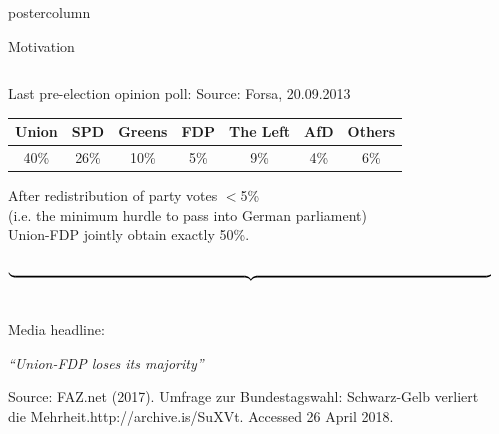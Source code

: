 \documentclass[final,hyperref={pdfpagelabels=false}]{beamer}
\newcommand{\blue}[1]{\textcolor{koaladarkestblue}{#1}}
\newcommand{\darkgray}[1]{\textcolor{koaladarkgray}{#1}}
\newcommand{\lightgray}[1]{\textcolor{koalagray}{#1}}
\begin{document}
\begin{frame}
\begin{columns}
\begin{column}{1\textwidth}
\begin{beamercolorbox}[center,wd=\textwidth]{postercolumn}
\begin{minipage}[T]{.95\textwidth}
\begin{block}{\footnotesize Motivation}
{{\begin{minipage}{0.94\textwidth}
\begin{columns}[t]
  \begin{column}{.29\textwidth}
  \darkgray{Last pre-election opinion poll:} \lightgray{\tiny Source: Forsa, 20.09.2013}
  \\[2.5ex]
  \begin{center}
  \begin{tabular}{ccccccc}
  \toprule
  \darkgray{Union} & {\footnotesize \lightgray{SPD}} & {\footnotesize \lightgray{Greens}} & \darkgray{FDP} & {\footnotesize \lightgray{The Left}} & {\footnotesize \lightgray{AfD}} & {\footnotesize \lightgray{Others}} \\ \midrule
  \darkgray{40\%} & {\footnotesize \lightgray{26\%}} & {\footnotesize \lightgray{10\%}} & \darkgray{5\%} & {\footnotesize \lightgray{9\%}} & {\footnotesize \lightgray{4\%}} & {\footnotesize \lightgray{6\%}} \\
  \bottomrule
  \end{tabular}
  \end{center}
  \vspace{1.5ex}
  \begin{center}
  \darkgray{After redistribution} \lightgray{\footnotesize of party votes $<$5\% \\ (i.e. the minimum hurdle to pass into German parliament)} \\
  \darkgray{Union-FDP} \lightgray{\footnotesize jointly} \darkgray{obtain} \lightgray{\footnotesize exactly} \darkgray{50\%}.
  \end{center}
  \vspace{-3ex}
  \textcolor{koalablue}{$$ \underbrace{\resizebox{\hsize}{!}{ }}_{ } $$}
  \ \\ \vspace{-2ex}
  \lightgray{\footnotesize Media headline:}
  \begin{center}
  \darkgray{\textit{\normalsize ``Union-FDP loses its majority''}}
  \end{center}
  \vspace{1ex}
  \lightgray{\tiny Source: FAZ.net (2017). Umfrage zur Bundestagswahl: Schwarz-Gelb verliert \\[-2ex]
  die Mehrheit.http://archive.is/SuXVt. Accessed 26 April 2018.}
  \end{column}

  \begin{column}{.025\textwidth}
  \vspace{11ex}
  \huge{\blue{}}
  \end{column}


\end{columns}
\end{minipage}}}
\end{block}
\end{minipage}
\end{beamercolorbox}
\end{column}
\end{columns}
\end{frame}
\end{document}

